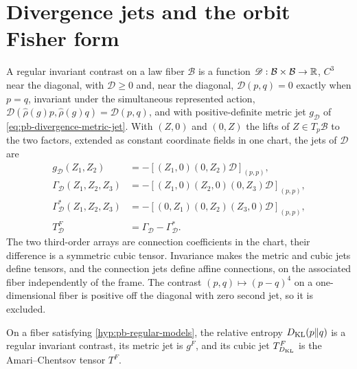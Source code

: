 \section{Divergence jets and the orbit Fisher form}
\label{sec:pb-divergence-jets}

A regular invariant contrast on a law fiber $\mathcal B$ is a function
$\mathscr D:\mathcal B\times\mathcal B\to\mathbb R$, $C^3$ near the diagonal, with
$\mathscr D\geq0$ and, near the diagonal, $\mathscr D(p,q)=0$ exactly when $p=q$,
invariant under the simultaneous represented action,
$\mathscr D(\widehat\rho(g)p,\widehat\rho(g)q)=\mathscr D(p,q)$, and with
positive-definite metric jet $g_{\mathscr D}$ of \eqref{eq:pb-divergence-metric-jet}.  With $(Z,0)$ and $(0,Z)$ the lifts of
$Z\in T_p\mathcal B$ to the two factors, extended as constant coordinate fields in one
chart, the jets of $\mathscr D$ are
\begin{align}
g_{\mathscr D}(Z_1,Z_2)
&=-[(Z_1,0)(0,Z_2)\mathscr D]_{(p,p)},
\label{eq:pb-divergence-metric-jet}\\
\Gamma_{\mathscr D}(Z_1,Z_2,Z_3)
&=-[(Z_1,0)(Z_2,0)(0,Z_3)\mathscr D]_{(p,p)},
\label{eq:pb-divergence-first-connection-jet}\\
\Gamma_{\mathscr D}^*(Z_1,Z_2,Z_3)
&=-[(0,Z_1)(0,Z_2)(Z_3,0)\mathscr D]_{(p,p)},
\label{eq:pb-divergence-dual-connection-jet}\\
T^F_{\mathscr D}
&=\Gamma_{\mathscr D}-\Gamma_{\mathscr D}^*.
\label{eq:pb-divergence-amari-jet}
\end{align}
The two third-order arrays are connection coefficients in the chart, their difference is
a symmetric cubic tensor. Invariance makes the metric and cubic jets define tensors,
and the connection jets define affine connections, on the associated fiber
independently of the frame.  The contrast $(p,q)\mapsto(p-q)^4$
on a one-dimensional fiber is positive off the diagonal with zero second jet, so it is
excluded.

On a fiber satisfying \cref{hyp:pb-regular-models}, the relative entropy
$D_{\mathrm{KL}}(p\Vert q)$ is a regular invariant contrast, its metric jet is $g^F$, and its cubic
jet $T^F_{D_{\mathrm{KL}}}$ is the Amari--Chentsov tensor $T^F$.  

